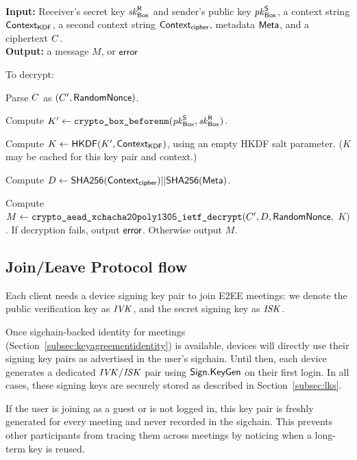 
{\underline {\bf \cboxdecrypt}} \\
{\bf Input:} Receiver's secret key $\mathit{sk}_{{\sf Box}}^{\sf R}$ and sender's public key $\mathit{pk}_{{\sf Box}}^{\sf S}$, a context string
${\sf Context}_\textsf{KDF}$, a second context string ${\sf Context}_\textsf{cipher}$, metadata ${\sf Meta}$,
and a ciphertext $C$. \\
{\bf Output:} a message $M$, or ${\sf error}$

To decrypt:

\vspace{-1em}
\begingroup
\RaggedRight
\begin{enumerate*}
\item Parse $C$ as $(C', {\sf RandomNonce})$.
\item Compute $K' \leftarrow \texttt{crypto\_box\_beforenm}(\mathit{pk}_{{\sf Box}}^{\sf S}, \mathit{sk}_{{\sf Box}}^{\sf R})$.
\item Compute $K \leftarrow {\sf HKDF}(K', {\sf Context}_\textsf{KDF})$, using an empty HKDF salt parameter.
($K$ may be cached for this key pair and context.)
\item Compute $D \leftarrow {\sf SHA256}({\sf Context}_\textsf{cipher}) || {\sf SHA256}({\sf Meta})$.
\item Compute $M \leftarrow \texttt{crypto\_aead\_xchacha20poly1305\_ietf\_decrypt}(C', D,
{\sf RandomNonce},$ $K)$. If decryption fails, output ${\sf error}$. Otherwise output $M$.
\end{enumerate*}
\endgroup

\subsection{Join/Leave Protocol flow}\label{subsec:joinleave}

Each client needs a device signing key pair to join E2EE meetings: we denote the public verification
key as $\mathit{IVK}$, and the secret signing key as $\mathit{ISK}$.

Once sigchain-backed identity for meetings (Section~\ref{subsec:keyagreementidentity}) is available,
devices will directly use their signing key pairs as advertised in the user's sigchain.  Until then,
each device generates a dedicated $\mathit{IVK}/\mathit{ISK}$ pair using ${\sf Sign}.\mathsf{KeyGen}$ on their first login. In
all cases, these signing keys are securely stored as described in Section~\ref{subsec:lks}.

If the user is joining as a guest or is not logged in, this key pair is freshly generated for every
meeting and never recorded in the sigchain. This prevents other participants from tracing them
across meetings by noticing when a long-term key is reused.

